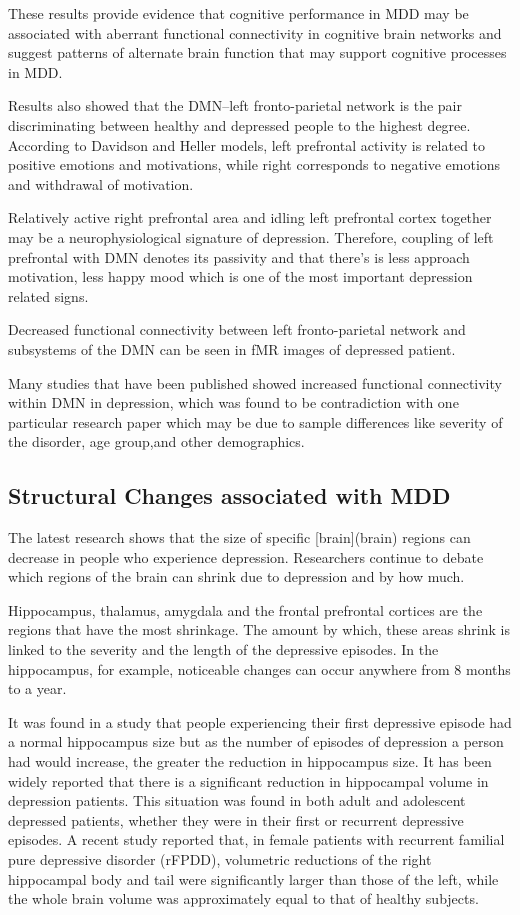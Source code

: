 \documentclass{article}
\begin{document}
These results provide evidence that cognitive performance in MDD may
be associated with aberrant functional connectivity in cognitive brain
networks and suggest patterns of alternate brain function that may
support cognitive processes in MDD.

Results also showed that the DMN–left fronto-parietal network is the
pair discriminating between healthy and depressed people to the
highest degree. According to Davidson and Heller models, left
prefrontal activity is related to positive emotions and motivations,
while right corresponds to negative emotions and withdrawal of
motivation.

Relatively active right prefrontal area and idling left
prefrontal cortex together may be a neurophysiological signature of
depression. Therefore, coupling of left prefrontal with DMN denotes
its passivity and that there's is less approach motivation, less happy
mood which is one of the most important depression related signs.


Decreased functional connectivity between left fronto-parietal network
and subsystems of the DMN can be seen in fMR images of depressed
patient.

Many studies that have been published showed increased functional
connectivity within DMN in depression, which was found to be
contradiction with one particular research paper which may be due to
sample differences like severity of the disorder, age group,and other
demographics.

\newpage
\subsection{Structural Changes associated with MDD}

The latest research shows that the size of specific [brain](brain)
regions can decrease in people who experience depression. Researchers
continue to debate which regions of the brain can shrink due to
depression and by how much.

Hippocampus, thalamus, amygdala and the frontal prefrontal cortices
are the regions that have the most shrinkage. The amount by which,
these areas shrink is linked to the severity and the length of the
depressive episodes. In the hippocampus, for example, noticeable
changes can occur anywhere from 8 months to a year.

It was found in a study that people experiencing their first
depressive episode had a normal hippocampus size but as the number of
episodes of depression a person had would increase, the greater the
reduction in hippocampus size. It has been widely reported that there
is a significant reduction in hippocampal volume in depression
patients.  This situation was found in both adult and adolescent
depressed patients, whether they were in their first or recurrent
depressive episodes. A recent study reported that, in female patients
with recurrent familial pure depressive disorder (rFPDD), volumetric
reductions of the right hippocampal body and tail were significantly
larger than those of the left, while the whole brain volume was
approximately equal to that of healthy subjects.
\end{document}
